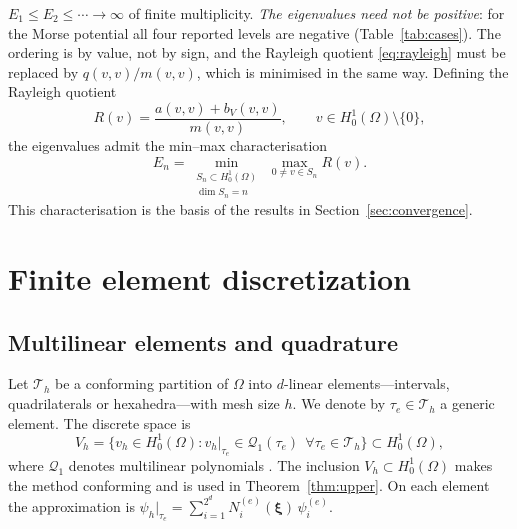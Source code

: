 \documentclass[pdflatex,sn-mathphys-num]{sn-jnl}
\theoremstyle{thmstyleone}%
\theoremstyle{thmstyletwo}%
\theoremstyle{thmstylethree}%
\begin{document}
$E_1 \le E_2 \le \cdots \to \infty$ of finite multiplicity. \emph{The eigenvalues
need not be positive}: for the Morse potential all four reported levels are
negative (Table~\ref{tab:cases}). The ordering is by value, not by sign, and the
Rayleigh quotient \eqref{eq:rayleigh} must be replaced by $q(v,v)/m(v,v)$, which
is minimised in the same way.
Defining the Rayleigh quotient \cite{courant1953}
%
\begin{equation}\label{eq:rayleigh}
  R(v) = \frac{a(v,v) + b_V(v,v)}{m(v,v)} ,
  \qquad v \in H^1_0(\Omega)\setminus\{0\},
\end{equation}
%
the eigenvalues admit the min--max characterisation
\cite{courant1953,babuska1991,boffi2010}
%
\begin{equation}\label{eq:minmax}
  E_n = \min_{\substack{S_n \subset H^1_0(\Omega) \\ \dim S_n = n}}
        \ \max_{0 \neq v \in S_n} R(v) .
\end{equation}
%
This characterisation is the basis of the results in
Section~\ref{sec:convergence}.

\section{Finite element discretization}\label{sec:fem}

\subsection{Multilinear elements and quadrature}

Let $\mathcal{T}_h$ be a conforming partition of $\Omega$ into $d$-linear
elements---intervals, quadrilaterals or hexahedra---with mesh size $h$. We
denote by $\tau_e \in \mathcal{T}_h$ a generic element. The
discrete space is
%
\begin{equation}
  V_h = \{ v_h \in H^1_0(\Omega) : v_h|_{\tau_e} \in \mathcal{Q}_1(\tau_e)
          \ \ \forall \tau_e \in \mathcal{T}_h \} \subset H^1_0(\Omega),
\end{equation}
%
where $\mathcal{Q}_1$ denotes multilinear polynomials \cite{strang1973}. The inclusion
$V_h \subset H^1_0(\Omega)$ makes the method conforming and is used in
Theorem~\ref{thm:upper}. On each element the approximation is
$\psi_h|_{\tau_e} = \sum_{i=1}^{2^d} N_i^{(e)}(\boldsymbol{\xi})\,\psi_i^{(e)}$.
\end{document}
